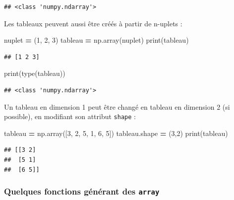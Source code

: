 \documentclass[12pt,]{book}
\newenvironment{Shaded}{\begin{snugshade}}{\end{snugshade}}
\newcommand{\DecValTok}[1]{\textcolor[rgb]{0.00,0.00,0.81}{#1}}
\newcommand{\OperatorTok}[1]{\textcolor[rgb]{0.81,0.36,0.00}{\textbf{#1}}}
\newcommand{\BuiltInTok}[1]{#1}
\newcommand{\NormalTok}[1]{#1}
\numberwithin{equation}{section}
\numberwithin{countremarque}{section}
\begin{document}
\begin{lstlisting}
## <class 'numpy.ndarray'>
\end{lstlisting}

Les tableaux peuvent aussi être créés à partir de n-uplets :

\begin{Shaded}
\begin{Highlighting}[]
\NormalTok{nuplet }\OperatorTok{=}\NormalTok{ (}\DecValTok{1}\NormalTok{, }\DecValTok{2}\NormalTok{, }\DecValTok{3}\NormalTok{)}
\NormalTok{tableau }\OperatorTok{=}\NormalTok{ np.array(nuplet)}
\BuiltInTok{print}\NormalTok{(tableau)}
\end{Highlighting}
\end{Shaded}

\begin{lstlisting}
## [1 2 3]
\end{lstlisting}

\begin{Shaded}
\begin{Highlighting}[]
\BuiltInTok{print}\NormalTok{(}\BuiltInTok{type}\NormalTok{(tableau))}
\end{Highlighting}
\end{Shaded}

\begin{lstlisting}
## <class 'numpy.ndarray'>
\end{lstlisting}

Un tableau en dimension 1 peut être changé en tableau en dimension 2 (si
possible), en modifiant son attribut \texttt{shape} :

\begin{Shaded}
\begin{Highlighting}[]
\NormalTok{tableau }\OperatorTok{=}\NormalTok{ np.array([}\DecValTok{3}\NormalTok{, }\DecValTok{2}\NormalTok{, }\DecValTok{5}\NormalTok{, }\DecValTok{1}\NormalTok{, }\DecValTok{6}\NormalTok{, }\DecValTok{5}\NormalTok{])}
\NormalTok{tableau.shape }\OperatorTok{=}\NormalTok{ (}\DecValTok{3}\NormalTok{,}\DecValTok{2}\NormalTok{)}
\BuiltInTok{print}\NormalTok{(tableau)}
\end{Highlighting}
\end{Shaded}

\begin{lstlisting}
## [[3 2]
##  [5 1]
##  [6 5]]
\end{lstlisting}

\subsubsection{\texorpdfstring{Quelques fonctions générant des
\texttt{array}}{Quelques fonctions générant des array}}\label{quelques-fonctions-generant-des-array}
\end{document}
